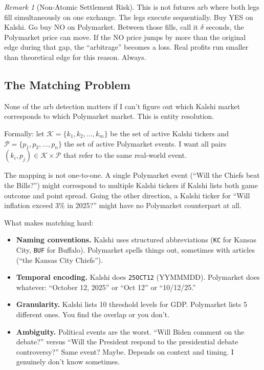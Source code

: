 \documentclass[11pt]{article}
\theoremstyle{definition}
\theoremstyle{remark}
\newtheorem{remark}[theorem]{Remark}
\begin{document}
\begin{remark}[Non-Atomic Settlement Risk]
\label{rem:non-atomic}
This is not futures arb where both legs fill simultaneously on one exchange. The legs execute sequentially. Buy YES on Kalshi. Go buy NO on Polymarket. Between those fills, call it $\delta$ seconds, the Polymarket price can move. If the NO price jumps by more than the original edge during that gap, the ``arbitrage'' becomes a loss. Real profits run smaller than theoretical edge for this reason. Always.
\end{remark}

\subsection{The Matching Problem}
\label{sec:matching-problem}

None of the arb detection matters if I can't figure out which Kalshi market corresponds to which Polymarket market. This is entity resolution.

Formally: let $\mathcal{K} = \{k_1, k_2, \ldots, k_m\}$ be the set of active Kalshi tickers and $\mathcal{P} = \{p_1, p_2, \ldots, p_n\}$ the set of active Polymarket events. I want all pairs $(k_i, p_j) \in \mathcal{K} \times \mathcal{P}$ that refer to the same real-world event.

The mapping is not one-to-one. A single Polymarket event (``Will the Chiefs beat the Bills?'') might correspond to multiple Kalshi tickers if Kalshi lists both game outcome and point spread. Going the other direction, a Kalshi ticker for ``Will inflation exceed 3\% in 2025?'' might have no Polymarket counterpart at all.

What makes matching hard:
\begin{itemize}
  \item \textbf{Naming conventions.} Kalshi uses structured abbreviations (\texttt{KC} for Kansas City, \texttt{BUF} for Buffalo). Polymarket spells things out, sometimes with articles (``the Kansas City Chiefs'').
  \item \textbf{Temporal encoding.} Kalshi does \texttt{25OCT12} (YYMMMDD). Polymarket does whatever: ``October 12, 2025'' or ``Oct 12'' or ``10/12/25.''
  \item \textbf{Granularity.} Kalshi lists 10 threshold levels for GDP. Polymarket lists 5 different ones. You find the overlap or you don't.
  \item \textbf{Ambiguity.} Political events are the worst. ``Will Biden comment on the debate?'' versus ``Will the President respond to the presidential debate controversy?'' Same event? Maybe. Depends on context and timing. I genuinely don't know sometimes.
\end{itemize}
\end{document}
